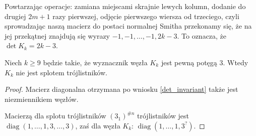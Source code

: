 Powtarzając operacje: zamiana miejscami skrajnie lewych kolumn, dodanie do drugiej $2m+1$ razy pierwszej, odjęcie pierwszego wiersza od trzeciego, czyli sprowadzając naszą macierz do postaci normalnej Smitha przekonamy się, że na jej przekątnej znajdują się wyrazy $-1, -1, \ldots, -1, 2k-3$.
To oznacza, że $\det K_k = 2k-3$.

\begin{proposition}
    Niech $k \ge 9$ będzie takie, że wyznacznik węzła $K_k$ jest pewną potęgą $3$.
    Wtedy $K_k$ nie jest splotem trójlistników.
\end{proposition}

\begin{proof}
    Macierz diagonalna otrzymana po wniosku \ref{det_invariant} także jest niezmiennikiem węzłów.

    Macierzą dla splotu trójlistników $(3_1)^{\# n}$ trójlistników jest $\operatorname{diag}(1, \ldots, 1, 3, \ldots, 3)$, zaś dla węzła $K_k$: $\operatorname{diag} (1, \ldots, 1, 3^?)$.
\end{proof}
